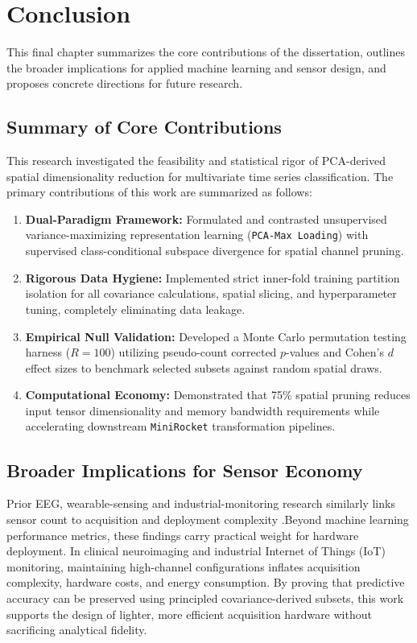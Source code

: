 \chapter{Conclusion}
\label{chap:conclusion}

\noindent
This final chapter summarizes the core contributions of the dissertation, outlines the broader implications for applied machine learning and sensor design, and proposes concrete directions for future research.


\section{Summary of Core Contributions}
\noindent
This research investigated the feasibility and statistical rigor of PCA-derived spatial dimensionality reduction for multivariate time series classification. The primary contributions of this work are summarized as follows:
\begin{enumerate}
    \item \textbf{Dual-Paradigm Framework:} Formulated and contrasted unsupervised variance-maximizing representation learning (\texttt{PCA-Max Loading}) with supervised class-conditional subspace divergence for spatial channel pruning.
    \item \textbf{Rigorous Data Hygiene:} Implemented strict inner-fold training partition isolation for all covariance calculations, spatial slicing, and hyperparameter tuning, completely eliminating data leakage.
    \item \textbf{Empirical Null Validation:} Developed a Monte Carlo permutation testing harness ($R = 100$) utilizing pseudo-count corrected $p$-values and Cohen's $d$ effect sizes to benchmark selected subsets against random spatial draws.
    \item \textbf{Computational Economy:} Demonstrated that 75\% spatial pruning reduces input tensor dimensionality and memory bandwidth requirements while accelerating downstream \texttt{MiniRocket} transformation pipelines.
\end{enumerate}

\section{Broader Implications for Sensor Economy}
\noindent
Prior EEG, wearable-sensing and industrial-monitoring research similarly
links sensor count to acquisition and deployment complexity
\citep{alotaiby2015channels,lara2013wearable,qin2012process}.Beyond machine learning performance metrics, these findings carry practical weight for hardware deployment. In clinical neuroimaging and industrial Internet of Things (IoT) monitoring, maintaining high-channel configurations inflates acquisition complexity, hardware costs, and energy consumption. By proving that predictive accuracy can be preserved using principled covariance-derived subsets, this work supports the design of lighter, more efficient acquisition hardware without sacrificing analytical fidelity.


